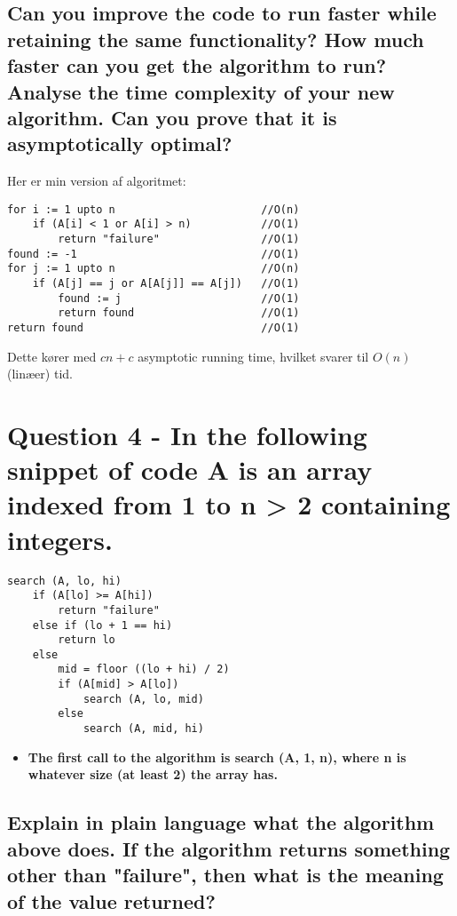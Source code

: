 \documentclass[a4paper,12pt]{article}
\begin{document}
\subsection[]{Can you improve the code to run faster while retaining the same functionality? How
much faster can you get the algorithm to run? Analyse the time complexity of your new
algorithm. Can you prove that it is asymptotically optimal?}

Her er min version af algoritmet:
\begin{lstlisting}
for i := 1 upto n                       //O(n)
    if (A[i] < 1 or A[i] > n)           //O(1)
        return "failure"                //O(1)
found := -1                             //O(1)
for j := 1 upto n                       //O(n)
    if (A[j] == j or A[A[j]] == A[j])   //O(1)
        found := j                      //O(1)
        return found                    //O(1)
return found                            //O(1)
\end{lstlisting}
Dette kører med $cn + c$ asymptotic running time, hvilket svarer til $O(n)$ (linæer) tid.

\section[Question 4]{Question 4 - In the following snippet of code A is an array indexed from 1 to n > 2 containing integers.}

\begin{lstlisting}
search (A, lo, hi)
    if (A[lo] >= A[hi])
        return "failure"
    else if (lo + 1 == hi)
        return lo
    else 
        mid = floor ((lo + hi) / 2)
        if (A[mid] > A[lo])
            search (A, lo, mid)
        else
            search (A, mid, hi)
\end{lstlisting}

\begin{itemize}
    \item[] \textbf{The first call to the algorithm is search (A, 1, n), where n is whatever size (at least 2) the
    array has.}
\end{itemize}

\subsection[]{Explain in plain language what the algorithm above does. If the algorithm returns something other than "failure", then what is the meaning of the value returned?}
    
\end{document}
